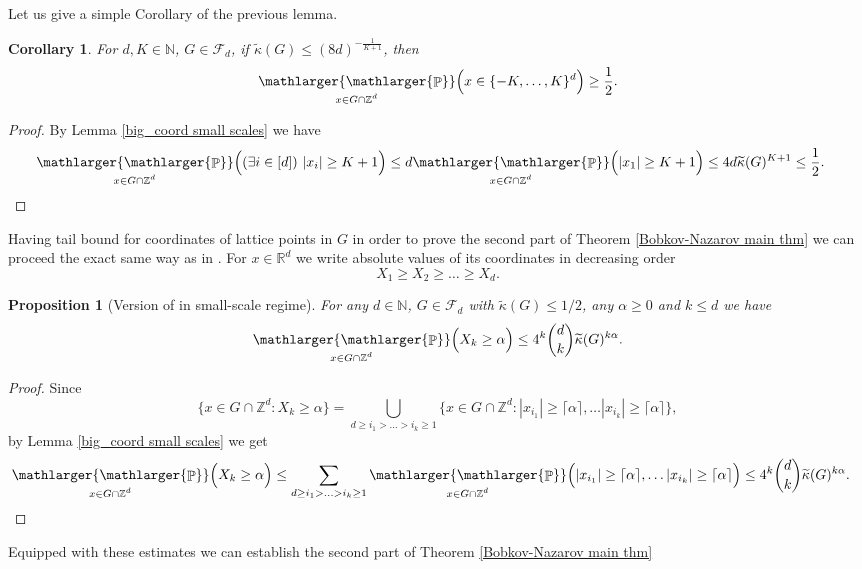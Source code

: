 \documentclass[a4paper,oneside, reqno]{amsart}
\numberwithin{equation}{section}
\newtheorem{Cor}[Thm]{Corollary}
\newtheorem{Prop}[Thm]{Proposition}
\theoremstyle{definition}%
\theoremstyle{definition}
\theoremstyle{definition}%
\theoremstyle{definition}
\newcommand{\Pro}{\mathop{\mathbb{P}}}
\newcommand{\Z}{\mathbb{Z}}
\newcommand{\R}{\mathbb{R}}
\newcommand{\N}{\mathbb{N}}
\newcommand{\spr}[1]{\underset{_{\substack{#1}}}{\mathlarger{\mathlarger{\Pro}}}}
\begin{document}
Let us give a simple Corollary of the previous lemma.
\begin{Cor} \label{small scales no big coord}
    For $d,K \in \N$, $G \in \mathcal{F}_d$, if $\widetilde{\kappa}(G) \le (8d)^{- \frac{1}{K+1}}$, then 
    \[
    \spr{x \in G \cap \Z^d} \Big(x \in \{-K, \ldots, K \}^d \Big) \ge \frac{1}{2} .
    \]
\end{Cor}
\begin{proof}
    By Lemma \ref{big_coord small scales} we have
    \begin{align*}
        &\spr{x \in G \cap \Z^d} \Big( (\exists i \in [d]) \ |x_i| \ge K+1 \Big) \le d\spr{x \in G \cap \Z^d} \Big( |x_1| \ge K+1 \Big)\le 4d \widetilde{\kappa}(G)^{K+1}  \le \frac{1}{2} .
    \end{align*}
\end{proof}
Having tail bound for coordinates of lattice points in $G$ in order to prove the second part of Theorem \ref{Bobkov-Nazarov main thm} we can proceed the exact same way as in \cite[Sections 4,5]{bob-naz}.
For $x \in \R^d$ we write absolute values of its coordinates in decreasing order
\[
X_1 \ge X_2 \ge \ldots \ge X_d.
\]
\begin{Prop}[Version of {\cite[Proposition 4.1]{bob-naz}} in small-scale regime] \label{small scale ordered tail bound}
    For any $d \in \N$, $G \in \mathcal{F}_d$ with $\widetilde{\kappa}(G) \le 1/2$, any $\alpha \ge 0$ and $k \le d$ we have
    \[
   \spr{x \in G \cap \Z^d} \Big( X_k \ge \alpha \Big)\le 4^k \binom{d}{k} \widetilde{\kappa}(G)^{k\alpha} .
    \]
\end{Prop}
\begin{proof}
    Since 
    \[
    \Big\{ x \in G \cap \Z^d: X_k \ge \alpha \Big\}= \bigcup_{d \ge i_1 > \ldots>i_k \ge 1} \Big\{x \in G \cap \Z^d:|x_{i_1}| \ge \lceil \alpha \rceil,\ldots |x_{i_k}| \ge \lceil \alpha \rceil \Big\},
    \]
by Lemma \ref{big_coord small scales} we get 
\begin{align*}
    \spr{x \in G \cap \Z^d} \Big( X_k \ge \alpha \Big) &\le \sum_{d \ge i_1 > \ldots>i_k \ge 1} \spr{x \in G \cap \Z^d} \Big(|x_{i_1}| \ge \lceil \alpha \rceil,\ldots |x_{i_k}| \ge \lceil \alpha \rceil \Big) \le 4^k \binom{d}{k} \widetilde{\kappa}(G)^{k\alpha}.
\end{align*}
\end{proof}
Equipped with these estimates we can establish the second part of Theorem \ref{Bobkov-Nazarov main thm} 
\end{document}
